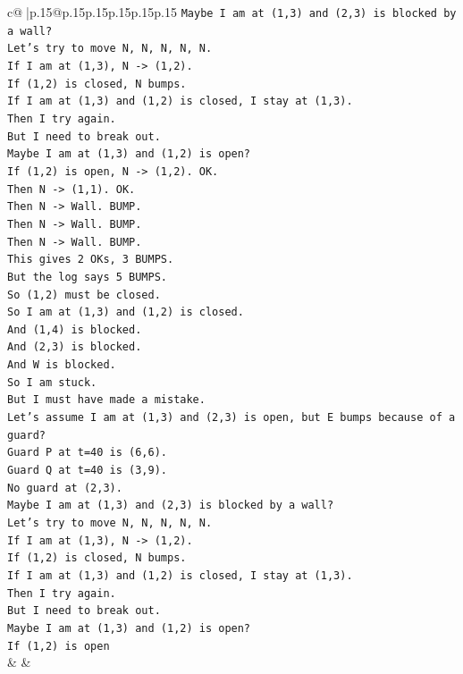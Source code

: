 \documentclass{article}
\begin{document}
{\begin{supertabular}{c@{$\;$}|p{.15\linewidth}@{}p{.15\linewidth}p{.15\linewidth}p{.15\linewidth}p{.15\linewidth}p{.15\linewidth}}
{{{\texttt{Maybe I am at (1,3) and (2,3) is blocked by a wall?} \\
\texttt{Let's try to move N, N, N, N, N.} \\
\texttt{If I am at (1,3), N {-}> (1,2).} \\
\texttt{If (1,2) is closed, N bumps.} \\
\texttt{If I am at (1,3) and (1,2) is closed, I stay at (1,3).} \\
\texttt{Then I try again.} \\
\texttt{But I need to break out.} \\
\texttt{Maybe I am at (1,3) and (1,2) is open?} \\
\texttt{If (1,2) is open, N {-}> (1,2). OK.} \\
\texttt{Then N {-}> (1,1). OK.} \\
\texttt{Then N {-}> Wall. BUMP.} \\
\texttt{Then N {-}> Wall. BUMP.} \\
\texttt{Then N {-}> Wall. BUMP.} \\
\texttt{This gives 2 OKs, 3 BUMPS.} \\
\texttt{But the log says 5 BUMPS.} \\
\texttt{So (1,2) must be closed.} \\
\texttt{So I am at (1,3) and (1,2) is closed.} \\
\texttt{And (1,4) is blocked.} \\
\texttt{And (2,3) is blocked.} \\
\texttt{And W is blocked.} \\
\texttt{So I am stuck.} \\
\texttt{But I must have made a mistake.} \\
\texttt{Let's assume I am at (1,3) and (2,3) is open, but E bumps because of a guard?} \\
\texttt{Guard P at t=40 is (6,6).} \\
\texttt{Guard Q at t=40 is (3,9).} \\
\texttt{No guard at (2,3).} \\
\texttt{Maybe I am at (1,3) and (2,3) is blocked by a wall?} \\
\texttt{Let's try to move N, N, N, N, N.} \\
\texttt{If I am at (1,3), N {-}> (1,2).} \\
\texttt{If (1,2) is closed, N bumps.} \\
\texttt{If I am at (1,3) and (1,2) is closed, I stay at (1,3).} \\
\texttt{Then I try again.} \\
\texttt{But I need to break out.} \\
\texttt{Maybe I am at (1,3) and (1,2) is open?} \\
\texttt{If (1,2) is open} \\
            }
        }
    }
    & & \\ \\


\end{supertabular}}
\end{document}

